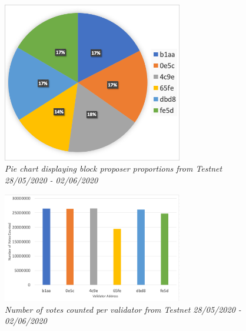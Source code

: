 \documentclass[12pt,openany,a4paper]{book}
\begin{document}
\begin{figure}[h]
    \caption{\sl Pie chart displaying block proposer proportions from Testnet 28/05/2020 - 02/06/2020}
    \label{validator_pie_1}
    \begin{center}
    \includegraphics[width=0.7\textwidth]{imgs/testnet_validator_pie_1.png}
    \end{center}
\end{figure}

\begin{figure}[h]
    \caption{\sl Number of votes counted per validator from Testnet 28/05/2020 - 02/06/2020}
    \label{validator_votes_1}
    \begin{center}
    \includegraphics[width=0.7\textwidth]{imgs/testnet_validator_votes_1.png}
    \end{center}
\end{figure}
\end{document}
